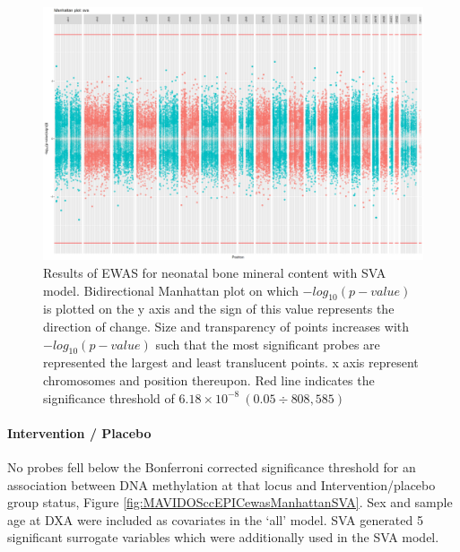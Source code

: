 \documentclass[
]{book}
\begin{document}
\begin{figure}

{\centering \includegraphics[width=0.8\linewidth]{figs/MAVIDOSbmcEPICewasManhattanSVA} 

}

\caption{Results of EWAS for neonatal bone mineral content with SVA model. Bidirectional Manhattan plot on which \(-log_{10}(p-value)\) is plotted on the y axis and the sign of this value represents the direction of change. Size and transparency of points increases with \(-log_{10}(p-value)\) such that the most significant probes are represented the largest and least translucent points. x axis represent chromosomes and position thereupon. Red line indicates the significance threshold of \(6.18\times10^{-8}~(0.05\div808,585)\)}\label{fig:MAVIDOSbmcEPICewasManhattanSVA}
\end{figure}



\hypertarget{intervention-placebo}{%
\paragraph{Intervention / Placebo}\label{intervention-placebo}}

No probes fell below the Bonferroni corrected significance threshold for an association between DNA methylation at that locus and Intervention/placebo group status, Figure \ref{fig:MAVIDOSccEPICewasManhattanSVA}.
Sex and sample age at DXA were included as covariates in the `all' model.
SVA generated 5 significant surrogate variables which were additionally used in the SVA model.
\end{document}
